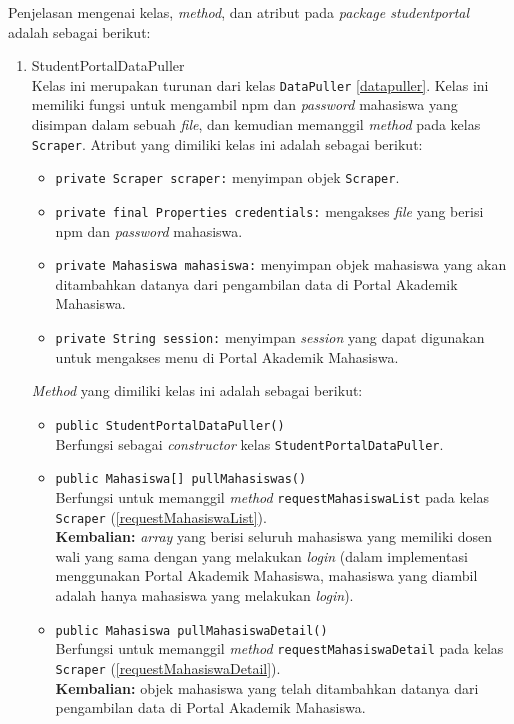 Penjelasan mengenai kelas, \textit{method}, dan atribut pada \textit{package studentportal} adalah sebagai berikut:
\begin{enumerate}
	
	\item{StudentPortalDataPuller}\\
	Kelas ini merupakan turunan dari kelas \texttt{DataPuller} \ref{datapuller}. Kelas ini memiliki fungsi untuk mengambil npm dan \textit{password} mahasiswa yang disimpan dalam sebuah \textit{file}, dan kemudian memanggil \textit{method} pada kelas \texttt{Scraper}. Atribut yang dimiliki kelas ini adalah sebagai berikut:
	\begin{itemize}
        \item \texttt{private Scraper scraper:} menyimpan objek \texttt{Scraper}.
        \item \texttt{private final Properties credentials:} mengakses \textit{file} yang berisi npm dan \textit{password} mahasiswa.
        \item \texttt{private Mahasiswa mahasiswa:} menyimpan objek mahasiswa yang akan ditambahkan datanya dari pengambilan data di Portal Akademik Mahasiswa.
        \item \texttt{private String session:} menyimpan \textit{session} yang dapat digunakan untuk mengakses menu di Portal Akademik Mahasiswa.
	\end{itemize}
	
	\textit{Method} yang dimiliki kelas ini adalah sebagai berikut:
	\begin{itemize}
		\item \texttt{public StudentPortalDataPuller()}\\
		Berfungsi sebagai \textit{constructor} kelas \texttt{StudentPortalDataPuller}.
		
		\item \texttt{public Mahasiswa[] pullMahasiswas()}\\
	    Berfungsi untuk memanggil \textit{method} \texttt{requestMahasiswaList} pada kelas \texttt{Scraper} (\ref{requestMahasiswaList}).\\
		\textbf{Kembalian:} \textit{array} yang berisi seluruh mahasiswa yang memiliki dosen wali yang sama dengan yang melakukan \textit{login} (dalam implementasi menggunakan Portal Akademik Mahasiswa, mahasiswa yang diambil adalah hanya mahasiswa yang melakukan \textit{login}).
		
		\item \texttt{public Mahasiswa pullMahasiswaDetail()}\\
	    Berfungsi untuk memanggil \textit{method} \texttt{requestMahasiswaDetail} pada kelas \texttt{Scraper} (\ref{requestMahasiswaDetail}).\\
		\textbf{Kembalian:} objek mahasiswa yang telah ditambahkan datanya dari pengambilan data di Portal Akademik Mahasiswa.
	\end{itemize}


\end{enumerate}
